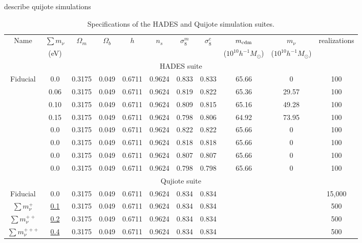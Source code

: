 \documentclass[12pt, letterpaper, preprint]{aastex62}
\newcommand{\smnu}{\sum m_\nu}
\newcommand{\ch}[1]{{\color{orange}{\bf CH:} #1}}
\begin{document}
\ch{describe quijote simulations} 

\begin{table}
\caption{Specifications of the HADES and Quijote simulation suites.} 
\begin{center}
\begin{tabular}{ccccccccccc} \toprule
    Name  &$\smnu$ & $\Omega_m$ & $\Omega_b$ & $h$ & $n_s$ & $\sigma^m_8$ & $\sigma^c_8$ & $m_{\rm cdm}$ & $m_\nu$ & realizations \\
      &(eV) & & & & & & & ($10^{10}h^{-1}M_\odot$) & ($10^{10}h^{-1}M_\odot$) & \\[3pt] \hline\hline
    \multicolumn{11}{c}{HADES suite} \\ \hline
    Fiducial    & 0.0   & 0.3175 & 0.049 & 0.6711 & 0.9624 & 0.833 & 0.833 & 65.66 & 0      &100 \\ 
                & 0.06  & 0.3175 & 0.049 & 0.6711 & 0.9624 & 0.819 & 0.822 & 65.36 & 29.57  &100 \\ 
                & 0.10  & 0.3175 & 0.049 & 0.6711 & 0.9624 & 0.809 & 0.815 & 65.16 & 49.28  &100 \\ 
                & 0.15  & 0.3175 & 0.049 & 0.6711 & 0.9624 & 0.798 & 0.806 & 64.92 & 73.95  &100 \\ 
                & 0.0   & 0.3175 & 0.049 & 0.6711 & 0.9624 & 0.822 & 0.822 & 65.66 & 0      &100 \\ 
                & 0.0   & 0.3175 & 0.049 & 0.6711 & 0.9624 & 0.818 & 0.818 & 65.66 & 0      &100 \\ 
                & 0.0   & 0.3175 & 0.049 & 0.6711 & 0.9624 & 0.807 & 0.807 & 65.66 & 0      &100 \\ 
                & 0.0   & 0.3175 & 0.049 & 0.6711 & 0.9624 & 0.798 & 0.798 & 65.66 & 0      &100 \\ 
    \hline \hline
    \multicolumn{11}{c}{Qujiote suite} \\ \hline
    Fiducial 	    & 0.0         & 0.3175 & 0.049 & 0.6711 & 0.9624 & 0.834 & 0.834 & & & 15,000 \\ 
    $\smnu^+$       & \underline{0.1}   & 0.3175 & 0.049 & 0.6711 & 0.9624 & 0.834 & 0.834 & & & 500 \\ 
    $\smnu^{++}$    & \underline{0.2}   & 0.3175 & 0.049 & 0.6711 & 0.9624 & 0.834 & 0.834 & & & 500 \\ 
    $\smnu^{+++}$   & \underline{0.4}   & 0.3175 & 0.049 & 0.6711 & 0.9624 & 0.834 & 0.834 & & & 500 \\ 

\end{tabular}
\end{center}
\end{table}
\end{document}
